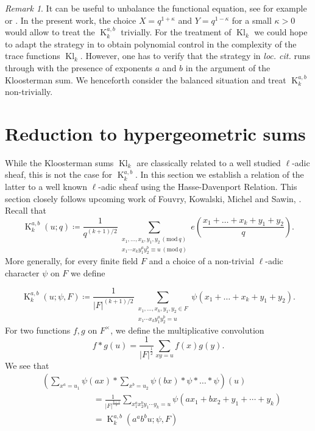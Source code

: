 \documentclass[12pt]{amsart}
\theoremstyle{plain}
\theoremstyle{definition}
\theoremstyle{remark}
\newtheorem{rem}[thm]{Remark}
\numberwithin{equation}{section}
\newcommand{\mods}[1]{\,(\mathrm{mod}\,{#1})}
\DeclareMathOperator{\Kl}{Kl}%
\DeclareMathOperator{\K}{K} %
\begin{document}
\begin{rem}It can be useful to unbalance the functional equation, see for example \cite{FKMsecondmom} or \cite{radziwiłł2023nonvanishingtwiststextgl4mathbbamathbbqlfunctions}.
   In the present work, the choice $X= q^{1+\kappa}$ and $Y=q^{1-\kappa}$ for a small $\kappa>0$ would allow to treat the $\K_k^{a,b}$ trivially. 
  For the treatment of $\Kl_k$ we could hope to adapt the strategy in \cite{KMSkloostermanStratification} to obtain polynomial control in the complexity of the trace functions $\Kl_k$.
However, one has to verify that the strategy in \emph{loc. cit.} runs through with the presence of exponents $a$ and $b$ in the argument of the Kloosterman sum. We henceforth consider the balanced situation and treat $\K_k^{a,b}$ non-trivially.
   \end{rem}


\section{Reduction to hypergeometric sums}\label{S: Hasse- Davenport}
While the Kloosterman sums $\Kl_k$ are classically related to a well studied $\ell$-adic sheaf, this is not the case for $\K_k^{a,b}$. In this section we establish a relation of the latter to a well known $\ell$-adic sheaf using the Hasse-Davenport Relation. This section closely follows upcoming work of Fouvry, Kowalski, Michel and Sawin, \cite{FKMSthirdmom}. 
Recall that
\[\K_k^{a,b}(u;q) \coloneqq \frac{1}{q^{(k+1)/2}} \sum_{\substack{ x_1,\dots, x_k, y_1, y_2 \mods q\\ x_1\cdots  x_k y_1^a  y_2^b \equiv u \mods q}}e\left(\frac{ x_1+\dots +  x_k+ y_1+ y_2}{q}\right).  \]
More generally, for every finite field $F$ and a choice of a non-trivial $\ell$-adic character $\psi$ on $F$ we define 

\begin{equation}\label{eq:4.1}\K_k^{a,b}( u;\psi,F) \coloneqq \frac{1}{\vert{F}\vert^{(k+1)/2}} \sum_{\substack{ x_1,\dots, x_k, y_1, y_2 \in F\\ x_1\cdots  x_k y_1^a  y_2^b =  u}}\psi( x_1+\dots +  x_k+ y_1+ y_2).\end{equation}
For two functions $f,g$ on $F^{\times}$, we define the multiplicative convolution
\[f\ast g(u ) = \frac{1}{{\vert{F}\vert^{\frac{1}{2}}}}\sum_{xy=u}f(x)g(y).\]
We see that
\begin{align*}
&\left(\sum_{x^{a}=u_1}\psi( ax) \ast \sum_{x^{b}=u_2}\psi(bx) \ast \psi \ast \dots \ast \psi\right)(u) \\&\qquad\qquad\qquad= \frac{1}{\vert{F}\vert^{\frac{k+1}{2}}}\sum_{x_1^{a}x_2^{b}y_1\cdots y_k=u }\psi(ax_1+bx_2+y_1+\cdots+ y_k)\\ &\qquad\qquad\qquad=\K_k^{a,b}(a^{a}b^{b}u;\psi,F)
\end{align*}
\end{document}
